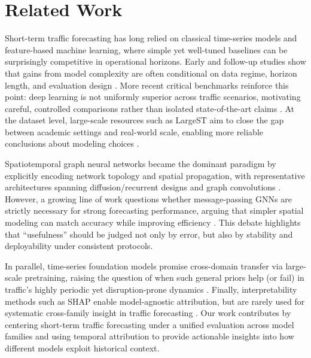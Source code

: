 \documentclass[10pt]{article}
\begin{document}


\section{Related Work}
\label{sec:related}

Short-term traffic forecasting has long relied on classical time-series models and feature-based machine learning, where simple yet well-tuned baselines can be surprisingly competitive in operational horizons. Early and follow-up studies show that gains from model complexity are often conditional on data regime, horizon length, and evaluation design \cite{smith2002comparison,karlaftis2011statistical}. More recent critical benchmarks reinforce this point: deep learning is not uniformly superior across traffic scenarios, motivating careful, controlled comparisons rather than isolated state-of-the-art claims \cite{manibardo2021deep}. At the dataset level, large-scale resources such as LargeST aim to close the gap between academic settings and real-world scale, enabling more reliable conclusions about modeling choices \cite{liu2023largest}.

Spatiotemporal graph neural networks  became the dominant paradigm by explicitly encoding network topology and spatial propagation, with representative architectures spanning diffusion/recurrent designs and graph convolutions \cite{yu2018stgcn,wu2019graphwavenet}. However, a growing line of work questions whether message-passing GNNs are strictly necessary for strong forecasting performance, arguing that simpler spatial modeling can match accuracy while improving efficiency \cite{liu2023needgnn}. This debate highlights that “usefulness” should be judged not only by error, but also by stability and deployability under consistent protocols.

In parallel, time-series foundation models promise cross-domain transfer via large-scale pretraining, raising the question of when such general priors help (or fail) in traffic’s highly periodic yet disruption-prone dynamics \cite{ansari2024chronos,das2024timesfm,woo2024moirai}. Finally, interpretability methods such as SHAP enable model-agnostic attribution, but are rarely used for systematic cross-family insight in traffic forecasting \cite{lundberg2017shap}. Our work contributes by centering short-term traffic forecasting under a unified evaluation across model families and using temporal attribution to provide actionable insights into how different models exploit historical context.
\end{document}
